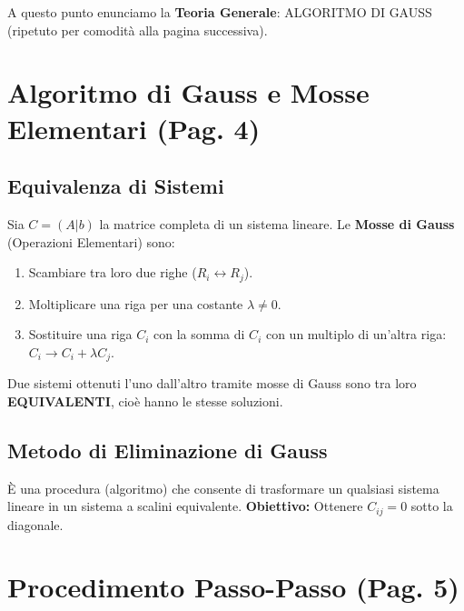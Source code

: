 A questo punto enunciamo la \textbf{Teoria Generale}: ALGORITMO DI GAUSS (ripetuto per comodità alla pagina successiva).

\section{Algoritmo di Gauss e Mosse Elementari (Pag. 4)}

\subsection{Equivalenza di Sistemi}
Sia $C = (A|b)$ la matrice completa di un sistema lineare.
Le \textbf{Mosse di Gauss} (Operazioni Elementari) sono:
\begin{enumerate}
    \item[(I)] Scambiare tra loro due righe ($R_i \leftrightarrow R_j$).
    \item[(II)] Moltiplicare una riga per una costante $\lambda \neq 0$.
    \item[(III)] Sostituire una riga $C_i$ con la somma di $C_i$ con un multiplo di un'altra riga: $C_i \to C_i + \lambda C_j$.
\end{enumerate}

Due sistemi ottenuti l'uno dall'altro tramite mosse di Gauss sono tra loro \textbf{EQUIVALENTI}, cioè hanno le stesse soluzioni.

\subsection{Metodo di Eliminazione di Gauss}
È una procedura (algoritmo) che consente di trasformare un qualsiasi sistema lineare in un sistema a scalini equivalente.
\textbf{Obiettivo:} Ottenere $C_{ij} = 0$ sotto la diagonale.

\section{Procedimento Passo-Passo (Pag. 5)}

